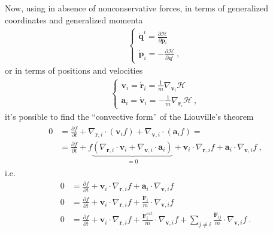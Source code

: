 \documentclass[letterpaper,10pt,english]{jupyterBook}
\begin{document}
\sphinxAtStartPar
Now, using  in absence of non\sphinxhyphen{}conservative forces, in terms of generalized coordinates and generalized momenta
\begin{equation*}
\begin{split}\begin{cases}
  \dot{\mathbf{q}}^i =  \frac{\partial \mathscr{H}}{\partial \mathbf{p}_i} \\
  \dot{\mathbf{p}}_i = -\frac{\partial \mathscr{H}}{\partial \mathbf{q}^i} \ ,
\end{cases}\end{split}
\end{equation*}
\sphinxAtStartPar
or in terms of positions and velocities
\begin{equation*}
\begin{split}\begin{cases}
  \mathbf{v}_i = \dot{\mathbf{r}}_i =  \frac{1}{m} \nabla_{\mathbf{v}_i} \mathscr{H} \\
  \mathbf{a}_i = \dot{\mathbf{v}}_i = -\frac{1}{m} \nabla_{\mathbf{r}_i} \mathscr{H} \ ,
\end{cases}\end{split}
\end{equation*}
\sphinxAtStartPar
it’s possible to find the “convective form” of the Liouville’s theorem
\begin{equation*}
\begin{split}\begin{aligned}
  0
  & = \frac{\partial f}{\partial t} + \nabla_{\mathbf{r},i} \cdot \left( \mathbf{v}_i f \right) + \nabla_{\mathbf{v},i} \cdot \left( \mathbf{a}_i f \right) = \\
  & = \frac{\partial f}{\partial t} + f \underbrace{\left( \nabla_{\mathbf{r},i} \cdot \mathbf{v}_i + \nabla_{\mathbf{v},i} \cdot \mathbf{a}_i \right)}_{=0} + \mathbf{v}_i \cdot \nabla_{\mathbf{r},i} f + \mathbf{a}_i \cdot \nabla_{\mathbf{v},i} f \ ,
\end{aligned}\end{split}
\end{equation*}
\sphinxAtStartPar
i.e.
\begin{equation*}
\begin{split}
0 & = \frac{\partial f}{\partial t} + \mathbf{v}_i \cdot \nabla_{\mathbf{r},i} f + \mathbf{a}_i \cdot \nabla_{\mathbf{v},i} f \\
0 & = \frac{\partial f}{\partial t} + \mathbf{v}_i \cdot \nabla_{\mathbf{r},i} f + \frac{\mathbf{F}_i}{m} \cdot \nabla_{\mathbf{v},i} f \\
0 & = \frac{\partial f}{\partial t} + \mathbf{v}_i \cdot \nabla_{\mathbf{r},i} f + \frac{\mathbf{F}_i^{ext}}{m} \cdot \nabla_{\mathbf{v},i} f + \sum_{j \ne i} \frac{\mathbf{F}_{ij}}{m} \cdot \nabla_{\mathbf{v},i} f  \ .
\end{split}
\end{equation*}
\end{document}
